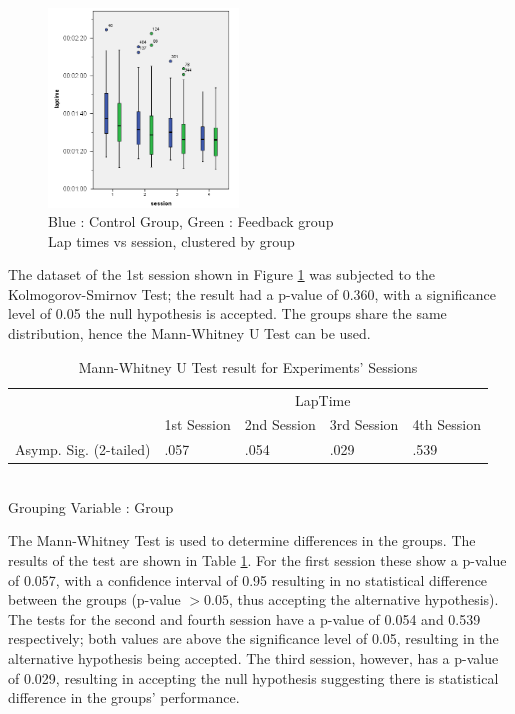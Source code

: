 \documentclass{sig-alternate}
\begin{document}
{\begin{figure}[!htb]
	\centering
	\includegraphics[width=0.45\textwidth]{charts/laptimes.png}
	\caption[Lap times vs session, clustered by group]{Blue : Control Group, Green : Feedback group \\ Lap times vs session, clustered by group}
	\label{fig:chart-laptimes}
\end{figure}

The dataset of the 1st session shown in Figure \ref{fig:chart-laptimes} was subjected to the Kolmogorov-Smirnov Test; the result had a p-value of 0.360, with a significance level of 0.05 the null hypothesis is accepted. The groups share the same distribution, hence the Mann-Whitney U Test can be used.

\begin{table}
	\centering
	\begin{tabular}{|l|l|l|l|l|}
		\hline
		& \multicolumn{4}{c|}{LapTime}            \\ \cline{2-5} 
		& 1st Session & 2nd Session & 3rd Session & 4th Session \\ \hline
		Asymp. Sig. (2-tailed) & .057 & .054        & .029        & .539        \\ \hline
	\end{tabular}\\
	Grouping Variable : Group
	\caption[Mann-Whitney U Test for Experiments' Sessions]{Mann-Whitney U Test result for Experiments' Sessions}
	\label{table:Mann-Whitney-Sessions}
\end{table}

The Mann-Whitney Test is used to determine differences in the groups. The results of the test are shown in Table \ref{table:Mann-Whitney-Sessions}. For the first session these show a p-value of 0.057, with a confidence interval of 0.95 resulting in no statistical difference between the groups (p-value $> 0.05$, thus accepting the alternative hypothesis).  The tests for the second and fourth session have a p-value of 0.054 and 0.539 respectively; both values are above the significance level of 0.05, resulting in the alternative hypothesis being accepted. The third session, however, has a p-value of 0.029, resulting in accepting the null hypothesis suggesting there is statistical difference in the groups' performance.

}
\end{document}
